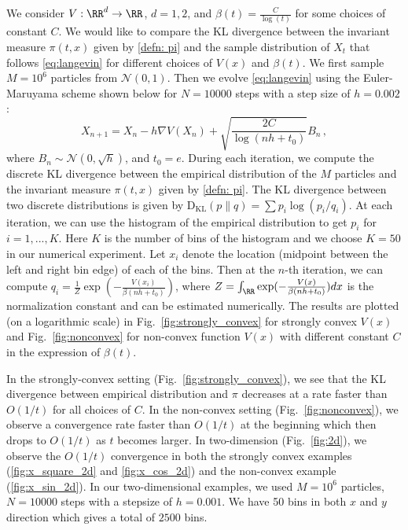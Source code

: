 \documentclass[11pt,reqno]{amsart}
\begin{document}
We consider $V:\RR^d \to \RR$, $d=1,2$, and $\beta(t) = \frac{C}{\log(t)}$ for some choices of constant $C$. We would like to compare the KL divergence between the invariant measure $\pi(t,x)$ given by \eqref{defn: pi} and the sample distribution of $X_t$ that follows \eqref{eq:langevin} for different choices of $V(x)$ and $\beta(t)$. We first sample $M=10^6$ particles from $\mathcal{N}(0,1)$. Then we evolve \eqref{eq:langevin} using the Euler-Maruyama scheme shown below for $N=10000$ steps with a step size of $h = 0.002$:
\begin{equation}\label{EM}
    X_{n+1} = X_n - h \nabla V(X_n) + \sqrt{\frac{2C}{\log(nh+t_0)}}B_n\,,
\end{equation}
where $B_n \sim \mathcal{N}(0,\sqrt{h})$, and $t_0 = e$. 
During each iteration, we compute the discrete KL divergence between the empirical distribution of the $M$ particles and the invariant measure $\pi(t,x)$ given by \eqref{defn: pi}. The KL divergence between two discrete distributions is given by $\mathrm{D}_{\mathrm{KL}}(p\|q)=\sum p_i \log(p_i/q_i)$. At each iteration, we can use the histogram of the empirical distribution to get $p_i$ for $i=1,...,K$. Here $K$ is the number of bins of the histogram and we choose $K=50$ in our numerical experiment. Let $x_i$ denote the location (midpoint between the left and right bin edge) of each of the bins. Then at the $n$-th iteration, we can compute $q_i = \frac{1}{Z}\exp(-\frac{V(x_i)}{\beta(nh+t_0)})$, where $Z = \int_{\RR}\exp(-\frac{V(x)}{\beta(nh+t_0)}) dx $ is the normalization constant and can be estimated numerically. The results are plotted (on a logarithmic scale) in Fig.~\ref{fig:strongly_convex} for strongly convex $V(x)$ and Fig.~\ref{fig:nonconvex} for non-convex function $V(x)$ with different constant $C$ in the expression of $\beta(t)$.   

In the strongly-convex setting (Fig.~\ref{fig:strongly_convex}), we see that the KL divergence between empirical distribution and $\pi$ decreases at a rate faster than $O(1/t)$ for all choices of $C$. In the non-convex setting (Fig.~\ref{fig:nonconvex}), we observe a convergence rate faster than $O(1/t)$ at the beginning which then drops to $O(1/t)$ as $t$ becomes larger. In two-dimension (Fig.~\ref{fig:2d}), we observe the $O(1/t)$ convergence in both the strongly convex examples (\ref{fig:x_square_2d} and \ref{fig:x_cos_2d}) and the non-convex example (\ref{fig:x_sin_2d}). In our two-dimensional examples, we used $M=10^6$ particles, $N=10000$ steps with a stepsize of $h=0.001$. We have 50 bins in both $x$ and $y$ direction which gives a total of $2500$ bins. 
\end{document}
